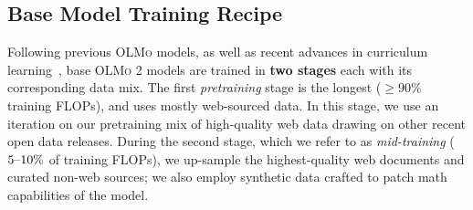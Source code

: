 \documentclass[table]{ai2style/ai2}
\newcommand{\olmo}{\textsc{OLMo}\xspace}
\newcommand{\olmotoo}{\textsc{OLMo 2}\xspace}
\begin{document}
\subsection{Base Model Training Recipe}
\label{section:training-recipe}
Following previous \olmo models, as well as recent advances in curriculum learning~\citep{blakeney2024doesdatasparkjoy,ibrahim2024simplescalablestrategiescontinually}, base \olmotoo models are trained in \textbf{two stages} each with its corresponding data mix. 
The first \textit{pretraining} stage is the longest ($\geqslant90\%$ training FLOPs), and uses mostly web-sourced data.
In this stage, we use an iteration on our pretraining mix of high-quality web data drawing on other recent open data releases.
During the second stage, which we refer to as \textit{mid-training}  ($5\textup{--}10\%$ of training FLOPs), we up-sample the highest-quality web documents and curated non-web sources;
we also employ synthetic data crafted to patch math capabilities of the model. 
\end{document}
